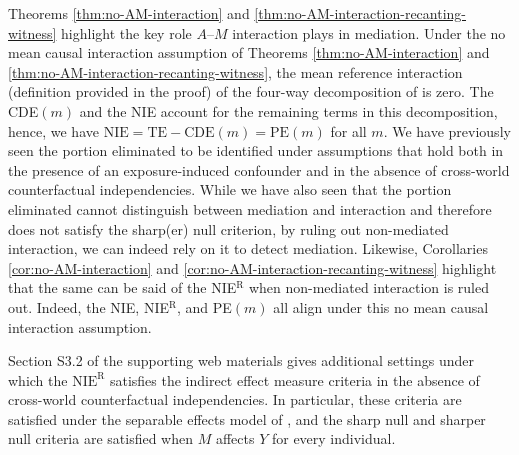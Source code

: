 \documentclass[12pt]{article}
\begin{document}
Theorems \ref{thm:no-AM-interaction} and \ref{thm:no-AM-interaction-recanting-witness} highlight the key role $A$--$M$ interaction plays in mediation. Under the no mean causal interaction assumption of Theorems \ref{thm:no-AM-interaction} and \ref{thm:no-AM-interaction-recanting-witness}, the mean reference interaction (definition provided in the proof) of the four-way decomposition of \cite{vanderweele2014unification} %
is zero. %
The CDE$(m)$ and the NIE account for the remaining terms in this decomposition, %
hence, we have $\text{NIE} = \text{TE} - \text{CDE}(m) = \text{PE}(m)$ for all $m$. We have previously seen the portion eliminated to be identified under assumptions that hold both in the presence of an exposure-induced confounder and in the absence of cross-world counterfactual independencies. While we have also seen that the portion eliminated cannot distinguish between mediation and interaction and therefore does not satisfy the sharp(er) null criterion, by ruling out non-mediated interaction, we can indeed rely on it to detect mediation. Likewise, Corollaries \ref{cor:no-AM-interaction} and \ref{cor:no-AM-interaction-recanting-witness} highlight that the same can be said of the NIE$^{\text{R}}$ when non-mediated interaction is ruled out. Indeed, the NIE, NIE$^{\text{R}}$, and PE$(m)$ all align under this no mean causal interaction assumption.


Section S3.2 of the supporting web materials gives additional settings under which the $\text{NIE}^{\mathrm{R}}$ satisfies the indirect effect measure criteria in the absence of cross-world counterfactual independencies. In particular, these criteria are satisfied under the separable effects model of \cite{robins2010alternative}, and the sharp null and sharper null criteria are satisfied when $M$ affects $Y$ for every individual.
\end{document}
